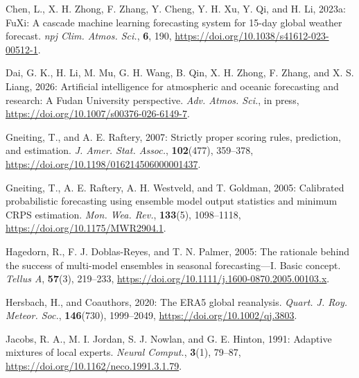 \documentclass[12pt]{article}
\begin{document}
\begin{Exercises}
\item\hspace*{-6mm}
Chen, L., X. H. Zhong, F. Zhang, Y. Cheng, Y. H. Xu, Y. Qi, and H. Li, 2023a: FuXi: A cascade machine learning forecasting system for 15-day global weather forecast. \textit{npj Clim. Atmos. Sci.}, \textbf{6}, 190, \url{https://doi.org/10.1038/s41612-023-00512-1}.

\item\hspace*{-6mm}
Dai, G. K., H. Li, M. Mu, G. H. Wang, B. Qin, X. H. Zhong, F. Zhang, and X. S. Liang, 2026: Artificial intelligence for atmospheric and oceanic forecasting and research: A Fudan University perspective. \textit{Adv. Atmos. Sci.}, in press, \url{https://doi.org/10.1007/s00376-026-6149-7}.

\item\hspace*{-6mm}
Gneiting, T., and A. E. Raftery, 2007: Strictly proper scoring rules, prediction, and estimation. \textit{J. Amer. Stat. Assoc.}, \textbf{102}(477), 359--378, \url{https://doi.org/10.1198/016214506000001437}.

\item\hspace*{-6mm}
Gneiting, T., A. E. Raftery, A. H. Westveld, and T. Goldman, 2005: Calibrated probabilistic forecasting using ensemble model output statistics and minimum CRPS estimation. \textit{Mon. Wea. Rev.}, \textbf{133}(5), 1098--1118, \url{https://doi.org/10.1175/MWR2904.1}.

\item\hspace*{-6mm}
Hagedorn, R., F. J. Doblas-Reyes, and T. N. Palmer, 2005: The rationale behind the success of multi-model ensembles in seasonal forecasting---I. Basic concept. \textit{Tellus A}, \textbf{57}(3), 219--233, \url{https://doi.org/10.1111/j.1600-0870.2005.00103.x}.

\item\hspace*{-6mm}
Hersbach, H., and Coauthors, 2020: The ERA5 global reanalysis. \textit{Quart. J. Roy. Meteor. Soc.}, \textbf{146}(730), 1999--2049, \url{https://doi.org/10.1002/qj.3803}.

\item\hspace*{-6mm}
Jacobs, R. A., M. I. Jordan, S. J. Nowlan, and G. E. Hinton, 1991: Adaptive mixtures of local experts. \textit{Neural Comput.}, \textbf{3}(1), 79--87, \url{https://doi.org/10.1162/neco.1991.3.1.79}.


\end{Exercises}
\end{document}
